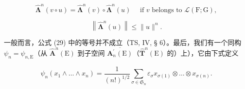 \[
\hat {\symbf {\Lambda}} ^ {n} (v \circ u) = \hat {\symbf {\Lambda}} ^ {n} (v) \circ \hat {\symbf {\Lambda}} ^ {n} (u) \quad \text { if } v \text { belongs   to } \mathscr {L} (\mathrm{F}; \mathrm{G}),\tag{28}
\]

\[
\left\| \hat {\symbf {\Lambda}} ^ {n} (u) \right\| \leqslant \| u \| ^ {n}.\tag{29}
\]

一般而言，公式 (29) 中的等号并不成立（TS, IV, § 6）。最后，我们有一个同构 \(\psi_{n} = \psi_{n,\mathrm{E}}\)（从 \(\hat{\mathbf{A}}^{n}(\mathrm{E})\) 到子空间 \(\overline{\mathbf{A}_{n}^{\prime}(\mathrm{E})}\)（\(\hat{\mathbf{T}}^{n}(\mathrm{E})\) 的）上），它由下式定义

\[
\psi_ {n} (x _ {1} \wedge \dots \wedge x _ {n}) = \frac {1}{(n !) ^ {1 / 2}} \sum_ {\sigma \in \mathfrak {S} _ {n}} \varepsilon_ {\sigma} x _ {\sigma (1)} \otimes \dots \otimes x _ {\sigma (n)}.\tag{30}
\]

